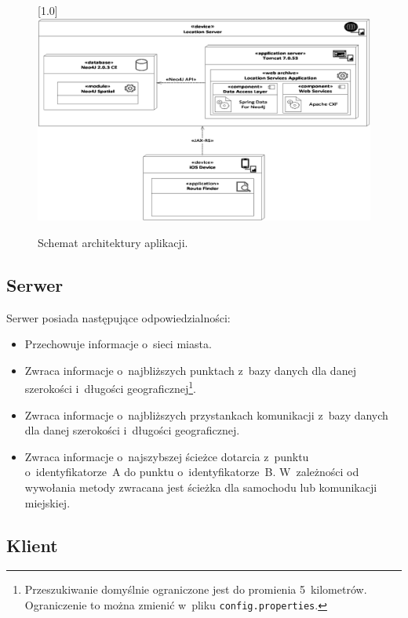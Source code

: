 \documentclass[a4paper,12pt]{article}
\begin{document}
	\begin{figure}[ht!]
		\centering
		\scalebox{0.7}[1.0]{
			\includegraphics{graphics/architecture.eps}
		}

		\caption{Schemat architektury aplikacji.}
		\label{fig:architecture}
	\end{figure}

	\subsection*{Serwer}

	Serwer posiada następujące odpowiedzialności:

	\begin{itemize}
		\item Przechowuje informacje o~sieci miasta.
		\item Zwraca informacje o~najbliższych punktach z~bazy danych dla danej szerokości i~długości geograficznej\footnote{Przeszukiwanie domyślnie ograniczone jest do promienia 5~kilometrów. Ograniczenie to można zmienić w~pliku \verb+config.properties+.}.
		\item Zwraca informacje o~najbliższych przystankach komunikacji z~bazy danych dla danej szerokości i~długości geograficznej\footnotemark[2].
		\item Zwraca informacje o~najszybszej ścieżce dotarcia z~punktu o~identyfikatorze~A do punktu o~identyfikatorze~B. W~zależności od wywołania metody zwracana jest ścieżka dla samochodu lub komunikacji miejskiej.
	\end{itemize}

	\subsection*{Klient}
\end{document}
